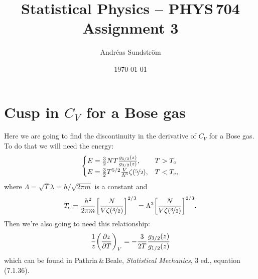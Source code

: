 \documentclass[11pt,letter, swedish, english
]{article}
\renewcommand{\thesubsection}{\arabic{section} (\alph{subsection})}
\begin{document}




\title{Statistical Physics -- PHYS\,704 \\
Assignment 3}
\author{Andréas Sundström}
\date{\today}

\maketitle


\newcommand{\Tc}{\ensuremath{T_{\text{c}}}}

\section{Cusp in $C_V$ for a Bose gas}
\renewcommand{\thesubsection}{\arabic{section} (\roman{subsection})}
Here we are going to find the discontinuity in the derivative of $C_V$
for a Bose gas. To do that we will need the energy:
\begin{equation}\label{eq:1_E}
\begin{cases}
E=\frac{3}{2}NT\frac{g_{5/2}(z)}{g_{3/2}(z)}, \quad& T>\Tc\\
E=\frac{3}{2}T^{5/2}\frac{V}{\Lambda^3}\zeta(\nicefrac{5}{2}), &T<\Tc,
\end{cases}
\end{equation}
where $\Lambda=\sqrt{T}\lambda=h/\sqrt{2\pi m}$ is a constant and
\begin{equation}
\Tc=\frac{h^2}{2\pi m}\qty[\frac{N}{V\zeta(\nicefrac{3}{2})}]^{2/3}
=\Lambda^2\qty[\frac{N}{V\zeta(\nicefrac{3}{2})}]^{2/3}.
\end{equation}
Then we're also going to need this relationship:
\begin{equation}\label{eq:1_dz}
\frac{1}{z}\qty(\pdv{z}{T})_V
=-\frac{3}{2T}\frac{g_{3/2}(z)}{g_{1/2}(z)}
\end{equation}
which can be found in Pathria\,\&\,Beale, \textit{Statistical
  Mechanics}, 3 ed., equation (7.1.36).
\end{document}
